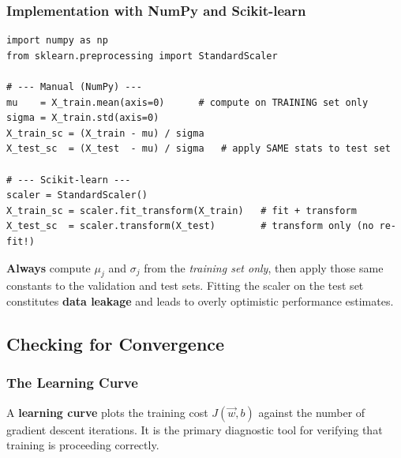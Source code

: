 \subsubsection{Implementation with NumPy and Scikit-learn}

\begin{lstlisting}[caption={Z-score normalisation in NumPy and Scikit-learn}]
import numpy as np
from sklearn.preprocessing import StandardScaler

# --- Manual (NumPy) ---
mu    = X_train.mean(axis=0)      # compute on TRAINING set only
sigma = X_train.std(axis=0)
X_train_sc = (X_train - mu) / sigma
X_test_sc  = (X_test  - mu) / sigma   # apply SAME stats to test set

# --- Scikit-learn ---
scaler = StandardScaler()
X_train_sc = scaler.fit_transform(X_train)   # fit + transform
X_test_sc  = scaler.transform(X_test)        # transform only (no re-fit!)
\end{lstlisting}

\begin{remark}
\textbf{Always} compute $\mu_j$ and $\sigma_j$ from the \emph{training set
only}, then apply those same constants to the validation and test sets.
Fitting the scaler on the test set constitutes \textbf{data leakage} and leads
to overly optimistic performance estimates.
\end{remark}

\subsection{Checking for Convergence}

\subsubsection{The Learning Curve}

A \textbf{learning curve} plots the training cost $J(\vec{w},b)$ against the
number of gradient descent iterations. It is the primary diagnostic tool for
verifying that training is proceeding correctly.

